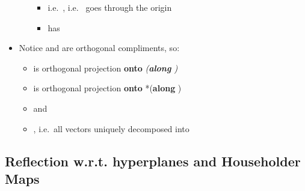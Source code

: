 \begin{itemize}
\begin{itemize}
                \begin{itemize}

                  \item
                        i.e.~, i.e.~ goes through the
                        origin
                  \item
                         has 
                \end{itemize}
        \end{itemize}
  \item
        Notice  and
         are orthogonal compliments,
        so:

        \begin{itemize}

          \item
                is orthogonal projection \textbf{onto} 
                \emph{(\textbf{along} )}
          \item
                is orthogonal projection \textbf{onto}  *(\textbf{along}
                )
          \item
                and
          \item
                ,
                i.e.~all vectors  uniquely
                decomposed into
        \end{itemize}
\end{itemize}

\subsection*{Reflection w.r.t. hyperplanes and Householder
  Maps}

